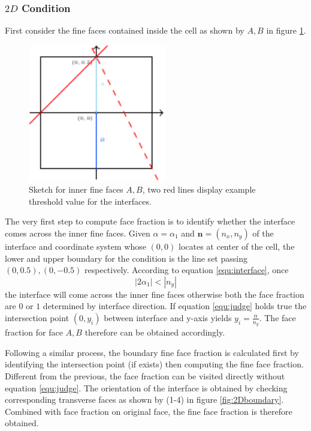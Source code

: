 \documentclass[a4paper]{article}
\begin{document}
\subsubsection{$2D$ Condition}
First consider the fine faces contained inside the cell as shown by $A,B$ in figure \ref{fig:2Dinner}.\par
\begin{figure}[h]
    \centering
    \includegraphics[height=6cm]{image/fs_2D.pdf}
    \caption{Sketch for inner fine faces $A,B$, two red lines display example threshold value for the interfaces.}
    \label{fig:2Dinner}
\end{figure}
The very first step to compute face fraction is to identify whether the interface comes across the inner fine faces. Given $\alpha=\alpha_1$ and $\mathbf{n}=(n_x,n_y)$ of the interface and coordinate system whose $(0,0)$ locates at center of the cell, the lower and upper boundary for the condition is the line set passing $(0,0.5),(0,-0.5)$ respectively. According to equation \ref{equ:interface}, once
\begin{equation}\label{equ:judge}
    |2\alpha_1|<|n_y|
\end{equation}
the interface will come across the inner fine faces otherwise both the face fraction are $0$ or $1$ determined by interface direction.
If equation \ref{equ:judge} holds true the intersection point $(0,y_i)$ between interface and y-axis yields $y_i = \frac{\alpha}{n_y}$. The face fraction for face $A,B$ therefore can be obtained accordingly.\par
Following a similar process, the boundary fine face fraction is calculated first by identifying the intersection point (if exists) then computing the fine face fraction. Different from the previous, the face fraction can be visited directly without equation \ref{equ:judge}. The orientation of the interface is obtained by checking corresponding transverse faces as shown by (1-4) in figure \ref{fig:2Dboundary}. Combined with face fraction on original face, the fine face fraction is therefore obtained.
\end{document}
